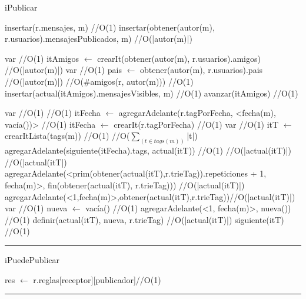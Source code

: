 \begin{algorithm}[H]
\caption{iPublicar}
\begin{algorithmic}[1]
\state insertar(r.mensajes, m) \hfill//O(1)
\state insertar(obtener(autor(m), r.usuarios).mensajesPublicados, m) \hfill//O(|autor(m)|)

\state var  \hfill//O(1)
\state itAmigos $\gets$ crearIt(obtener(autor(m), r.usuarios).amigos) \hfill//O(|autor(m)|)
\state var  \hfill//O(1)
\state pais $\gets$ obtener(autor(m), r.usuarios).pais  \hfill//O(|autor(m)|)
 \hfill//O(\#amigos(r, autor(m)))
 \hfill//O(1)
\state insertar(actual(itAmigos).mensajesVisibles, m) \hfill//O(1)
\endif
\state avanzar(itAmigos) \hfill//O(1)
\endwhile

\state var  \hfill//O(1)
 \hfill//O(1) 
\state itFecha $\gets$ agregarAdelante(r.tagPorFecha, <fecha(m), vacía())> \hfill//O(1)
\Else
\state itFecha $\gets$ crearIt(r.tagPorFecha) \hfill//O(1)
\endif
\state var  \hfill//O(1)
\state itT $\gets$ crearItLista(tags(m)) \hfill//O(1)
 \hfill//O($\sum_{(t \in tags(m))}$|t|)
\state agregarAdelante(siguiente(itFecha).tags, actual(itT)) \hfill//O(1)
 \hfill//O(|actual(itT)|)
\hfill//O(|actual(itT|)
\state agregarAdelante(<prim(obtener(actual(itT),r.trieTag)).repeticiones + 1, fecha(m)>, fin(obtener(actual(itT), r.trieTag))) \hfill//O(|actual(itT)|)
\Else
\state agregarAdelante(<1,fecha(m)>,obtener(actual(itT),r.trieTag))\hfill//O(|actual(itT)|)
\endif
\Else
\state var  \hfill//O(1)
\state nueva $\gets$ vacía() \hfill//O(1)
\state agregarAdelante(<1, fecha(m)>, nueva()) \hfill//O(1)
\state definir(actual(itT), nueva, r.trieTag) \hfill//O(|actual(itT)|)
\endif
\state siguiente(itT) \hfill//O(1)
\endwhile

\EndFunction 
\end{algorithmic}
\hrule
{}
\end{algorithm}


\begin{algorithm}[H]
\caption{iPuedePublicar}
\begin{algorithmic}[1]
\state res $\gets$ r.reglas[receptor][publicador]\hfill//O(1)
\EndFunction 
\end{algorithmic}
\hrule
{}
\end{algorithm}


